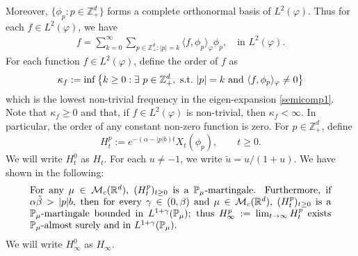 \documentclass[12pt,a4paper]{amsart}
\theoremstyle{plain}
\theoremstyle{definition}
\numberwithin{equation}{section}
\begin{document}
Moreover, $\{\phi_p: p \in \mathbb Z_+^d\}$ forms a complete orthonormal basis of $L^2(\varphi)$.
Thus for each $f\in L^2(\varphi)$, we have
\begin{align}
  \label{semicomp1}
  f
  = \sum_{k=0}^{\infty}\sum_{p\in \mathbb Z_+^d:|p|=k}\langle f, \phi_p \rangle_{\varphi} \phi_p
  , \quad \text{in~} L^2(\varphi).
\end{align}
For each function $f\in L^2(\varphi)$, define the order of $f$ as
\[
  \kappa_f
  := \inf \left \{k\geq 0: \exists ~ p\in \mathbb Z_+^d , {\rm ~s.t.~} |p|=k {\rm ~and~}  \langle f, \phi_p \rangle_{\varphi}\neq 0\right \}
\]
which is the lowest non-trivial frequency in the eigen-expansion \eqref{semicomp1}.
Note that $ \kappa_f\geq 0$ and that, if $f\in L^2(\varphi)$ is non-trivial, then $\kappa_f<\infty$.
In particular, the order of any constant non-zero function is zero.
For $p\in \mathbb{Z}_+^d$, define
\[
  H_t^p
  := e^{-(\alpha-|p|b)t}X_t(\phi_p), \qquad t\geq 0.
\]
We will write $H^0_t$ as $H_t$.
For each $u \neq -1$, we write $\tilde u = u/(1+ u)$.
We have shown in \cite[Lemma 3.2]{RenSongSunZhao2019Stable} the following:
\begin{equation}\label{eq:Hinfty}
\begin{minipage}{0.9\textwidth}
	For any $\mu\in \mathcal M_c(\mathbb R^d)$, $(H_t^p)_{t\geq 0}$ is a $\mathbb{P}_{\mu}$-martingale.
	Furthermore, if $\alpha \tilde \beta>|p|b$, then for every $\gamma\in (0, \beta)$ and $\mu\in \mathcal M_c(\mathbb R^d)$,  $(H_t^p)_{t\geq 0}$ is a $\mathbb{P}_{\mu}$-martingale bounded in $L^{1+\gamma}(\mathbb{P}_{\mu})$;
	thus $H^p_{\infty}:=\lim_{t\rightarrow \infty}H_t^p$ exists $\mathbb{P}_{\mu}$-almost surely and in $L^{1+\gamma}(\mathbb P_\mu)$.
\end{minipage}
\end{equation}
We will write $H^0_\infty$ as $H_\infty$.
\end{document}
